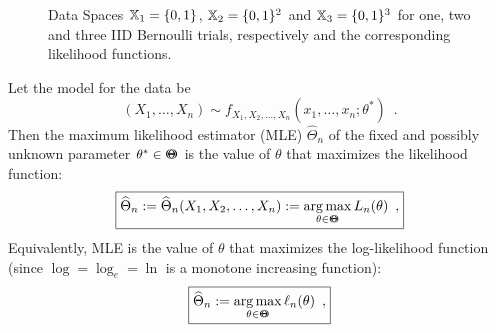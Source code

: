 \begin{figure}[htbp]
\caption{Data Spaces $\mathbb{X}_1=\{0,1\}$, $\mathbb{X}_2=\{0,1\}^2$ and $\mathbb{X}_3=\{0,1\}^3$ for one, two and three IID Bernoulli trials, respectively and the corresponding likelihood functions.\label{F:BernoulliSampleLkl}}
\centering   {}
\end{figure}


\begin{definition}\label{D:MLE}
{\rm
Let the model for the data be
$$(X_1,\ldots,X_n) \sim f_{X_1,X_2,\ldots,X_n}(x_1,\ldots,x_n;\theta^*) \enspace .$$ 
Then the maximum likelihood estimator (MLE) $\widehat{\Theta}_n$ of the fixed and possibly unknown parameter $\theta^* \in {\Theta}\mspace{-11 mu}{\Theta}$ is the value of $\theta$ that maximizes the likelihood function:
\[
\boxed{
\widehat{\Theta}_n := \widehat{\Theta}_n(X_1,X_2,\ldots,X_n) :=  \argmax_{\theta \in \BB{\Theta}} L_n(\theta) \enspace ,
}
\]
Equivalently, MLE is the value of $\theta$ that maximizes the log-likelihood function (since $\log=\log_e=\ln$ is a monotone increasing function):
\[
\boxed{
\widehat{\Theta}_n := \argmax_{\theta \in \BB{\Theta}} \ell_n(\theta) \enspace ,
}
\]
}
\end{definition}

